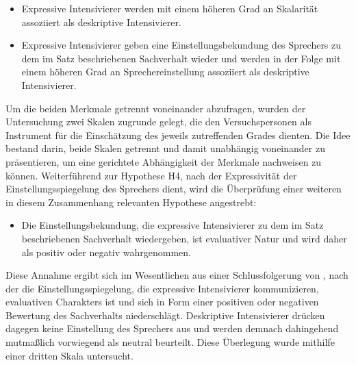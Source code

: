 \begin{itemize}
\item[\textbf{\textsc{H3}}] Expressive Intensivierer werden mit einem höheren Grad an Skalarität
assoziiert als deskriptive Intensivierer. 

\item[\textbf{\textsc{H4}}] Expressive Intensivierer geben eine Einstellungsbekundung des Sprechers
zu dem im Satz beschriebenen Sachverhalt wieder und werden in der Folge mit einem höheren Grad an Sprechereinstellung assoziiert als deskriptive Intensivierer. 
\end{itemize}

\noindent Um die beiden Merkmale getrennt voneinander abzufragen, wurden der Untersuchung zwei Skalen zugrunde gelegt, die den Versuchspersonen als Instrument für die Einschätzung des jeweils zutreffenden Grades dienten. Die Idee bestand darin, beide Skalen getrennt und damit unabhängig voneinander zu präsentieren, um eine gerichtete Abhängigkeit der Merkmale nachweisen zu können. Weiterführend zur Hypothese H4, nach der Expressivität der Einstellungsspiegelung des Sprechers dient, wird die Überprüfung einer weiteren in diesem Zusammenhang relevanten Hypothese angestrebt:

\begin{itemize} 
\item[\textbf{\textsc{H5}}] Die Einstellungsbekundung, die expressive Intensivierer zu dem im Satz beschriebenen Sachverhalt wiedergeben, ist evaluativer Natur und wird daher als positiv oder negativ wahrgenommen.
\end{itemize}

\noindent Diese Annahme ergibt sich im Wesentlichen aus einer Schlussfolgerung von {\citet[135]{Gutzmann.2019a}}, nach der die Einstellungsspiegelung, die expressive Intensivierer kommunizieren, evaluativen Charakters ist und sich in Form einer positiven oder negativen Bewertung des Sachverhalts niederschlägt. Deskriptive Intensivierer drücken dagegen keine Einstellung des Sprechers aus und werden demnach dahingehend mutmaßlich vorwiegend als neutral beurteilt. Diese Überlegung wurde mithilfe einer dritten Skala untersucht.





